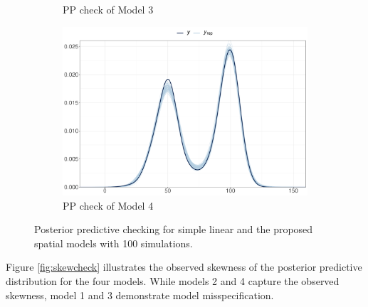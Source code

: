 \documentclass[a4paper]{article}   	%
\begin{document}
\begin{figure}[!htp]
\begin{subfigure}[t]{0.45\textwidth}
			\caption{PP check of Model 3}
		\end{subfigure}
		\begin{subfigure}[t]{0.45\textwidth}
			\includegraphics[width=\linewidth]{Images/ppcheck_STRand}
			\caption{PP check of Model 4}
		\end{subfigure}
		\caption{Posterior predictive checking for simple linear and the proposed spatial models with 100 simulations.}\label{fig:ppcheck}
	\end{figure}
	
	
	Figure \ref{fig:skewcheck} illustrates the observed skewness of the posterior predictive distribution for the four models. While models 2 and 4 capture the observed skewness, model 1 and 3 demonstrate model misspecification. 
	
\end{document}
